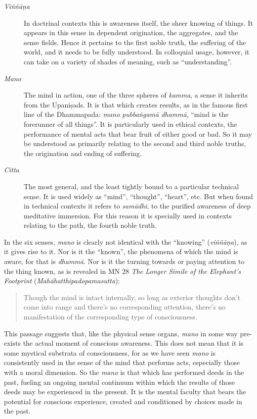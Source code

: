 \documentclass[12pt,openany]{book}%
\begin{document}
\begin{description}%
\item[\textit{\textsanskrit{Viññāṇa}}] In doctrinal contexts this is awareness itself, the sheer knowing of things. It appears in this sense in dependent origination, the aggregates, and the sense fields. Hence it pertains to the first noble truth, the suffering of the world, and it needs to be fully understood. In colloquial usage, however, it can take on a variety of shades of meaning, such as “understanding”.%
\item[\textit{Mano}] The mind in action, one of the three spheres of \textit{kamma}, a sense it inherits from the \textsanskrit{Upaniṣads}. It is that which creates results, as in the famous first line of the Dhammapada: \textit{mano \textsanskrit{pubbaṅgamā} \textsanskrit{dhammā}}, “mind is the forerunner of all things”. It is particularly used in ethical contexts, the performance of mental acts that bear fruit of either good or bad. So it may be understood as primarily relating to the second and third noble truths, the origination and ending of suffering.%
\item[\textit{Citta}] The most general, and the least tightly bound to a particular technical sense. It is used widely as “mind”, “thought”, “heart”, etc. But when found in technical contexts it refers to \textit{\textsanskrit{samādhi}}, to the purified awareness of deep meditative immersion. For this reason it is specially used in contexts relating to the path, the fourth noble truth.%
\end{description}

In the six senses, \textit{mano} is clearly not identical with the “knowing” (\textit{\textsanskrit{viññāṇa}}), as it gives rise to it. Nor is it the “known”, the phenomena of which the mind is aware, for that is \textit{\textsanskrit{dhammā}}. Nor is it the turning towards or paying attention to the thing known, as is revealed in MN 28 \textit{The Longer Simile of the Elephant’s Footprint} (\textit{\textsanskrit{Mahāhatthipadopamasutta}}):

\begin{quotation}%
Though the mind is intact internally, so long as exterior thoughts don’t come into range and there’s no corresponding attention, there’s no manifestation of the corresponding type of consciousness.

%
\end{quotation}

This passage suggests that, like the physical sense organs, \textit{mano} in some way pre-exists the actual moment of conscious awareness. This does not mean that it is some mystical substrata of consciousness, for as we have seen \textit{mano} is consistently used in the sense of the mind that performs acts, especially those with a moral dimension. So the \textit{mano} is that which has performed deeds in the past, fueling an ongoing mental continuum within which the results of those deeds may be experienced in the present. It is the mental faculty that bears the potential for conscious experience, created and conditioned by choices made in the past.
\end{document}
